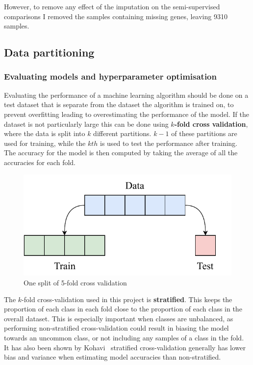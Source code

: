 \documentclass[12pt,a4paper,twoside,openright]{report}
\begin{document}
However, to remove any effect of the imputation on the semi-supervised comparisons I removed the samples containing missing genes, leaving 
9310 samples. 

\subsection{Data partitioning}
\subsubsection{Evaluating models and hyperparameter optimisation}
Evaluating the performance of a machine learning algorithm should be done on a test dataset that is separate from the dataset the 
algorithm is trained on, to prevent overfitting leading to overestimating the performance of the model. If the dataset is not particularly 
large this can be done using 
\textbf{$k$-fold cross validation}, where the data is split into $k$ different partitions. $k-1$ of these partitions are used for training, 
while the $kth$ is used to test the performance after training. The accuracy for the model is then computed by taking the average of all
the accuracies for each fold.

\begin{figure}[H]
  \centering
  \includegraphics[scale=1]{figs/k_fold.pdf}
  \caption{One split of 5-fold cross validation}
\end{figure}

The $k$-fold cross-validation used in this project is \textbf{stratified}. This keeps the proportion of each class in each fold
close to the proportion of each class in the overall dataset. This is especially important when classes are unbalanced, as performing 
non-stratified cross-validation could result in biasing the model towards an uncommon class, or not including any samples of a class in the 
fold. It has also been shown by Kohavi~\cite{Kohavi:1995:SCB:1643031.1643047} stratified cross-validation generally has lower bias and variance when estimating model 
accuracies than non-stratified.
\end{document}
